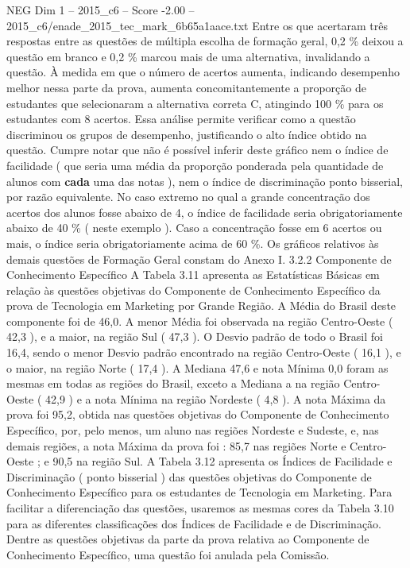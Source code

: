 \begin{textsample}{NEG Dim 1 – 2015\_c6 – Score -2.00 – 2015\_c6/enade\_2015\_tec\_mark\_6b65a1aace.txt}
Entre os que acertaram três respostas entre as questões de múltipla escolha de formação geral, 0,2 \% deixou a questão em branco e 0,2 \% marcou mais de uma alternativa, invalidando a questão.
À medida em que o número de acertos aumenta, indicando desempenho melhor nessa parte da prova, aumenta concomitantemente a proporção de estudantes que selecionaram a alternativa correta C, atingindo 100 \% para os estudantes com 8 acertos.
Essa análise permite verificar como a questão discriminou os grupos de desempenho, justificando o alto índice obtido na questão.
Cumpre notar que não é possível inferir deste gráfico nem o índice de facilidade ( que seria uma média da proporção ponderada pela quantidade de alunos com \textbf{cada} uma das notas ), nem o índice de discriminação ponto bisserial, por razão equivalente.
No caso extremo no qual a grande concentração dos acertos dos alunos fosse abaixo de 4, o índice de facilidade seria obrigatoriamente abaixo de 40 \% ( neste exemplo ).
Caso a concentração fosse em 6 acertos ou mais, o índice seria obrigatoriamente acima de 60 \%.
Os gráficos relativos às demais questões de Formação Geral constam do Anexo I. 3.2.2 Componente de Conhecimento Específico A Tabela 3.11 apresenta as Estatísticas Básicas em relação às questões objetivas do Componente de Conhecimento Específico da prova de Tecnologia em Marketing por Grande Região.
A Média do Brasil deste componente foi de 46,0.
A menor Média foi observada na região Centro-Oeste ( 42,3 ), e a maior, na região Sul ( 47,3 ).
O Desvio padrão de todo o Brasil foi 16,4, sendo o menor Desvio padrão encontrado na região Centro-Oeste ( 16,1 ), e o maior, na região Norte ( 17,4 ).
A Mediana 47,6 e nota Mínima 0,0 foram as mesmas em todas as regiões do Brasil, exceto a Mediana a na região Centro-Oeste ( 42,9 ) e a nota Mínima na região Nordeste ( 4,8 ).
A nota Máxima da prova foi 95,2, obtida nas questões objetivas do Componente de Conhecimento Específico, por, pelo menos, um aluno nas regiões Nordeste e Sudeste, e, nas demais regiões, a nota Máxima da prova foi : 85,7 nas regiões Norte e Centro-Oeste ; e 90,5 na região Sul.
A Tabela 3.12 apresenta os Índices de Facilidade e Discriminação ( ponto bisserial ) das questões objetivas do Componente de Conhecimento Específico para os estudantes de Tecnologia em Marketing.
Para facilitar a diferenciação das questões, usaremos as mesmas cores da Tabela 3.10 para as diferentes classificações dos Índices de Facilidade e de Discriminação.
Dentre as questões objetivas da parte da prova relativa ao Componente de Conhecimento Específico, uma questão foi anulada pela Comissão.

\end{textsample}
